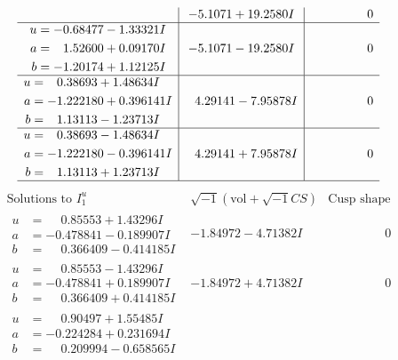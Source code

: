 \documentclass[1p]{elsarticle_modified}
\theoremstyle{definition}
\newcommand{\I}{\sqrt{-1}}
\begin{document}
$$\begin{array}{c|c|c}
 & -5.1071 + 19.2580 I & \phantom{-0.000000 } 0 \\ \hline\begin{aligned}
u &= -0.68477 - 1.33321 I \\
a &= \phantom{-}1.52600 + 0.09170 I \\
b &= -1.20174 + 1.12125 I\end{aligned}
 & -5.1071 - 19.2580 I & \phantom{-0.000000 } 0 \\ \hline\begin{aligned}
u &= \phantom{-}0.38693 + 1.48634 I \\
a &= -1.222180 + 0.396141 I \\
b &= \phantom{-}1.13113 - 1.23713 I\end{aligned}
 & \phantom{-}4.29141 - 7.95878 I & \phantom{-0.000000 } 0 \\ \hline\begin{aligned}
u &= \phantom{-}0.38693 - 1.48634 I \\
a &= -1.222180 - 0.396141 I \\
b &= \phantom{-}1.13113 + 1.23713 I\end{aligned}
 & \phantom{-}4.29141 + 7.95878 I & \phantom{-0.000000 } 0\\
 \hline 
 \end{array}$$\newpage$$\begin{array}{c|c|c}  
\text{Solutions to }I^u_{1}& \I (\text{vol} + \sqrt{-1}CS) & \text{Cusp shape}\\
 \hline 
\begin{aligned}
u &= \phantom{-}0.85553 + 1.43296 I \\
a &= -0.478841 - 0.189907 I \\
b &= \phantom{-}0.366409 - 0.414185 I\end{aligned}
 & -1.84972 - 4.71382 I & \phantom{-0.000000 } 0 \\ \hline\begin{aligned}
u &= \phantom{-}0.85553 - 1.43296 I \\
a &= -0.478841 + 0.189907 I \\
b &= \phantom{-}0.366409 + 0.414185 I\end{aligned}
 & -1.84972 + 4.71382 I & \phantom{-0.000000 } 0 \\ \hline\begin{aligned}
u &= \phantom{-}0.90497 + 1.55485 I \\
a &= -0.224284 + 0.231694 I \\
b &= \phantom{-}0.209994 - 0.658565 I\end{aligned}

\end{array}$$
\end{document}
